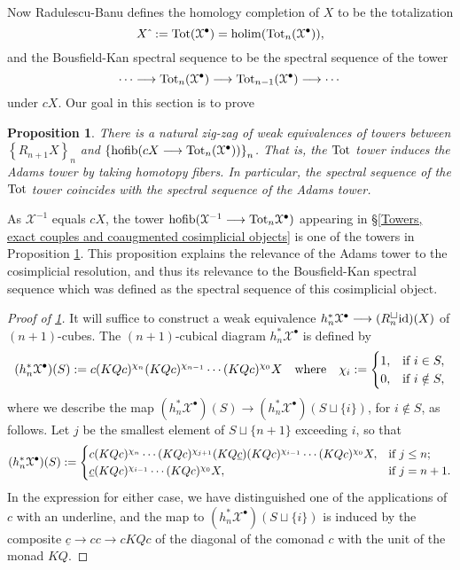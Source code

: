 \documentclass[11pt]{amsart} \renewcommand{\baselinestretch}{1.4}
\theoremstyle{plain}
\newtheorem{prop}[thm]{Proposition}
\theoremstyle{definition}
\DeclareMathOperator*{\holim}{holim}
\DeclareMathOperator*{\hofib}{hofib}
\renewcommand{\to}{\longrightarrow}
\newcommand{\calx}{\mathcal{X}}
\newcommand{\Id}{\mathrm{id}}
\newcommand{\plainD}{R}
\begin{document}
\begin{Bousfield-Kan spectral sequence}
Now Radulescu-Banu defines the homology completion of $X$ to be the totalization
\[X\hat{\ }:=\textup{Tot}(\calx^\bullet)=\holim (\textup{Tot}_n(\calx^\bullet)),\]
and the Bousfield-Kan spectral sequence to be the spectral sequence of the tower
\[\cdots \to\textup{Tot}_n(\calx^\bullet)\to \textup{Tot}_{n-1}(\calx^\bullet)\to\cdots \]
under $cX$. Our goal in this section is to prove
\begin{prop}
\label{towerIdentification}
There is a natural zig-zag of weak equivalences of towers between $\left\{\plainD_{n+1}X\right\}_n$ and $\left\{\hofib(cX\to\textup{Tot}_{n}(\calx^\bullet))\right\}_n$. That is,  the $\textup{Tot}$ tower induces the Adams tower by taking homotopy fibers. In particular, the spectral sequence of the $\textup{Tot}$ tower coincides with the spectral sequence of the Adams tower.
\end{prop}
\noindent As $\calx^{-1}$ equals $cX$, the tower $\hofib(\calx^{-1}\to\textup{Tot}_n\calx^{\bullet})$ appearing in \S\ref{Towers, exact couples and coaugmented cosimplicial objects} is one of the towers in Proposition \ref{towerIdentification}. This proposition explains the relevance of the Adams tower to the cosimplicial resolution, and thus its relevance to the Bousfield-Kan spectral sequence which was defined as the spectral sequence of this cosimplicial object.
\begin{proof}[Proof of \ref{towerIdentification}] 
It will suffice to construct a weak equivalence $h_n^*\calx^\bullet\to (\plainD_n^{\smash{\square}}\Id  )(X)$ of $(n+1)$-cubes. The $(n+1)$-cubical diagram $h_n^*\calx^\bullet$ is defined by
\[(h_n^*\calx^\bullet)(S):= c(KQc)^{\chi_{n}}(KQc)^{\chi_{n-1}}\cdots (KQc)^{\chi_0}X\quad \textup{where}\quad \chi_i:=\begin{cases}
1,&\textup{if }i\in S,\\
0,&\textup{if }i\notin S,
\end{cases}
\]
where we describe the map $(h_n^*\calx^\bullet)(S)\to (h_n^*\calx^\bullet)(S\sqcup\{i\})$, for $i\notin S$, as follows. Let $j$ be the smallest element of $S\sqcup\{n+1\}$ exceeding $i$, so that
\[(h_n^*\calx^\bullet)(S):= \begin{cases}
c(KQc)^{\chi_{n}}\cdots (KQc)^{\chi_{j+1}}(KQ\underline{c})(KQc)^{\chi_{i-1}}\cdots (KQc)^{\chi_0}X,&\textup{if }j\leq n;\\
\underline{c}(KQc)^{\chi_{i-1}}\cdots (KQc)^{\chi_0}X,&\textup{if }j=n+1.
\end{cases}
\]
In the expression for either case, we have distinguished one of the applications of $c$ with an underline, and the map to $(h_n^*\calx^\bullet)(S\sqcup\{i\})$ is induced by the composite $\underline{c}\to cc\to cKQc$ of the diagonal of the comonad $c$ with the unit of the monad $KQ$. 


\end{proof}
\end{Bousfield-Kan spectral sequence}
\end{document}
